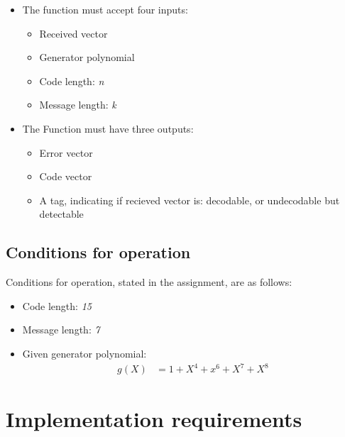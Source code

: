 \documentclass[MiniProjectMain]{subfiles}
\begin{document}
\begin{itemize}

\item 
The function must accept four inputs:

	\begin{itemize}
	\item Received vector
	\item Generator polynomial
	\item Code length: \textit{n}
	\item Message length: \textit{k}
	\end{itemize}

\newpage
\item The Function must have three outputs:

	\begin{itemize}
	\item Error vector
	\item Code vector
	\item A tag, indicating if recieved vector is:
		\subitem decodable, or
		\subitem undecodable but detectable
	\end{itemize}
	
\end{itemize}

\subsection{Conditions for operation}
Conditions for operation, stated in the assignment, are as follows:

\begin{itemize}

\item Code length: \textit{15}
\item Message length: \textit{7}
\item Given generator polynomial:
\begin{align}
g(X) &= 1 + X^4 + x^6 + X^7 + X^8
\end{align}

\end{itemize}


\section{Implementation requirements}
\end{document}
